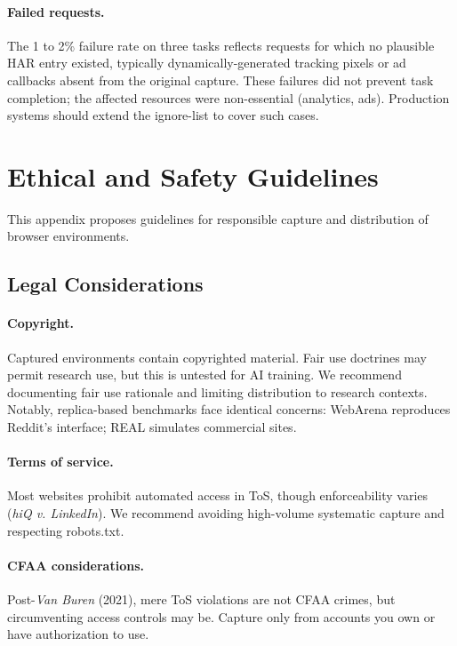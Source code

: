 \documentclass[letterpaper]{article}
\begin{document}
\paragraph{Failed requests.} The 1 to 2\% failure rate on three tasks reflects requests for which no plausible HAR entry existed, typically dynamically-generated tracking pixels or ad callbacks absent from the original capture. These failures did not prevent task completion; the affected resources were non-essential (analytics, ads). Production systems should extend the ignore-list to cover such cases.


\section{Ethical and Safety Guidelines}
\label{app:ethics}

This appendix proposes guidelines for responsible capture and distribution of browser environments.

\subsection{Legal Considerations}

\paragraph{Copyright.} Captured environments contain copyrighted material. Fair use doctrines may permit research use, but this is untested for AI training. We recommend documenting fair use rationale and limiting distribution to research contexts. Notably, replica-based benchmarks face identical concerns: WebArena reproduces Reddit's interface; REAL simulates commercial sites.

\paragraph{Terms of service.} Most websites prohibit automated access in ToS, though enforceability varies (\emph{hiQ v. LinkedIn}). We recommend avoiding high-volume systematic capture and respecting robots.txt.

\paragraph{CFAA considerations.} Post-\emph{Van Buren} (2021), mere ToS violations are not CFAA crimes, but circumventing access controls may be. Capture only from accounts you own or have authorization to use.
\end{document}
